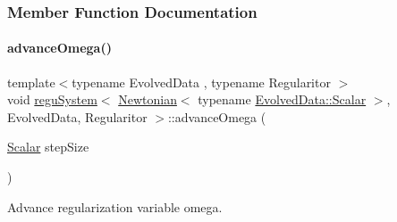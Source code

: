 \subsubsection{Member Function Documentation}
\mbox{\label{classregu_system_3_01_newtonian_3_01typename_01_evolved_data_1_1_scalar_01_4_00_01_evolved_data_00_01_regularitor_01_4_a114c39dbc724ee6cda9f2b3da8d1ff3c}} 
\paragraph{\texorpdfstring{advance\+Omega()}{advanceOmega()}}
{\footnotesize\ttfamily template$<$typename Evolved\+Data , typename Regularitor $>$ \\
void \mbox{\hyperlink{classregu_system}{regu\+System}}$<$ \mbox{\hyperlink{class_newtonian}{Newtonian}}$<$ typename \mbox{\hyperlink{classregu_system_aca8ee2c387943164ee3ea68370fc3ac0}{Evolved\+Data\+::\+Scalar}} $>$, Evolved\+Data, Regularitor $>$\+::advance\+Omega (\begin{DoxyParamCaption}\item[{\mbox{\hyperlink{classregu_system_3_01_newtonian_3_01typename_01_evolved_data_1_1_scalar_01_4_00_01_evolved_data_00_01_regularitor_01_4_a6993f135075541f441a7642845b183a5}{Scalar}}}]{step\+Size }\end{DoxyParamCaption})\hspace{0.3cm}{\ttfamily [private]}}



Advance regularization variable omega. 

